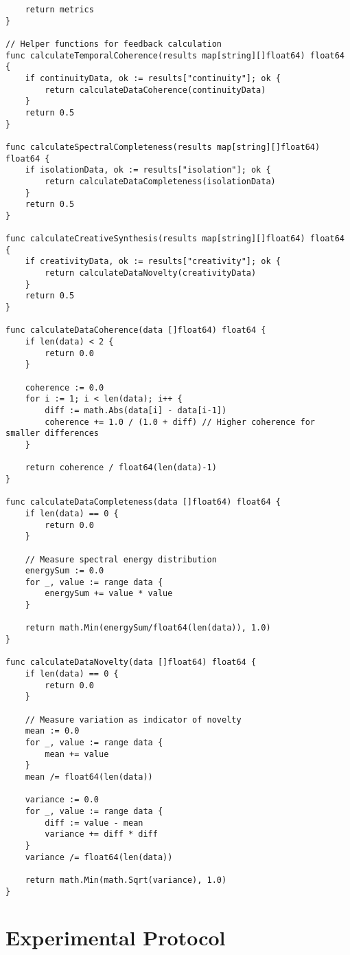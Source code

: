 \begin{tcolorbox}[colback=CodeBackground, colframe=DarkGray, title=Complete System Integration, fonttitle=\bfseries]
\begin{verbatim}
    return metrics
}

// Helper functions for feedback calculation
func calculateTemporalCoherence(results map[string][]float64) float64 {
    if continuityData, ok := results["continuity"]; ok {
        return calculateDataCoherence(continuityData)
    }
    return 0.5
}

func calculateSpectralCompleteness(results map[string][]float64) float64 {
    if isolationData, ok := results["isolation"]; ok {
        return calculateDataCompleteness(isolationData)
    }
    return 0.5
}

func calculateCreativeSynthesis(results map[string][]float64) float64 {
    if creativityData, ok := results["creativity"]; ok {
        return calculateDataNovelty(creativityData)
    }
    return 0.5
}

func calculateDataCoherence(data []float64) float64 {
    if len(data) < 2 {
        return 0.0
    }
    
    coherence := 0.0
    for i := 1; i < len(data); i++ {
        diff := math.Abs(data[i] - data[i-1])
        coherence += 1.0 / (1.0 + diff) // Higher coherence for smaller differences
    }
    
    return coherence / float64(len(data)-1)
}

func calculateDataCompleteness(data []float64) float64 {
    if len(data) == 0 {
        return 0.0
    }
    
    // Measure spectral energy distribution
    energySum := 0.0
    for _, value := range data {
        energySum += value * value
    }
    
    return math.Min(energySum/float64(len(data)), 1.0)
}

func calculateDataNovelty(data []float64) float64 {
    if len(data) == 0 {
        return 0.0
    }
    
    // Measure variation as indicator of novelty
    mean := 0.0
    for _, value := range data {
        mean += value
    }
    mean /= float64(len(data))
    
    variance := 0.0
    for _, value := range data {
        diff := value - mean
        variance += diff * diff
    }
    variance /= float64(len(data))
    
    return math.Min(math.Sqrt(variance), 1.0)
}
\end{verbatim}
\end{tcolorbox}

\section{Experimental Protocol}

